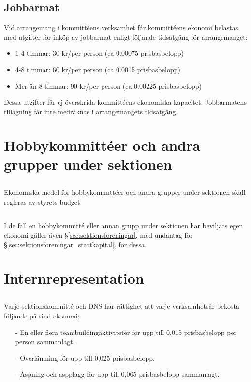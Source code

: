\documentclass[a4paper, 10pt]{article}
\begin{document}
\subsection{Jobbarmat}
Vid arrangemang i kommittéens verksamhet får kommittéens ekonomi belastas med utgifter för inköp av jobbarmat enligt följande tidsåtgång för arrangemanget:
\begin{itemize}
    \item 1-4 timmar: 30 kr/per person (ca 0.00075 prisbasbelopp)
    \item 4-8 timmar: 60 kr/per person (ca 0.0015 prisbasbelopp)
    \item Mer än 8 timmar: 90 kr/per person (ca 0.00225 prisbasbelopp)
\end{itemize}
Dessa utgifter får ej överskrida kommittéens ekonomiska kapacitet. Jobbarmatens tillagning får inte medräknas i arrangemangets tidsåtgång

\section{Hobbykommittéer och andra grupper under sektionen}
\subsection{}
Ekonomiska medel för hobbykommittéer och andra grupper under sektionen skall regleras av styrets budget
\subsection{}
I de fall en hobbykommitté eller annan grupp under sektionen har beviljats egen ekonomi gäller även §\ref{sec:sektionsforeningar}, med undantag för §\ref{sec:sektionsforeningar_startkapital}, för dessa.

\section{Internrepresentation}
\subsection{}
\label{sec:internreps}
Varje sektionskommitté och DNS har rättighet att varje verksamhetsår bekosta följande på sind ekonomi:
\begin{itemize}
    \item[-] En eller flera teambuildingaktiviteter för upp till 0,015 prisbasbelopp per person sammanlagt.
    \item[-] Överlämning för upp till 0,025 prisbasbelopp.
    \item[-] Aspning och aspplagg för upp till 0,065 prisbasbelopp sammanlagt.
\end{itemize}
\end{document}
